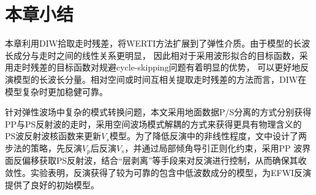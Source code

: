 \section{本章小结}
本章利用DIW拾取走时残差，将WERTI方法扩展到了弹性介质。由于模型的长波长成分与走时之间的线性关系更明显，
因此相对于采用波形拟合的目标函数，采用走时残差的目标函数对规避cycle-skipping问题有着明显的优势，
可以更好地反演模型的长波长分量。相对空间或时间互相关提取走时残差的方法而言，DIW在模型复杂时更加稳健可靠。

针对弹性波场中复杂的模式转换问题，本文采用地面数据P/S分离的方式分别获得PP与PS反射波的走时，采用空间波场模式解耦的方式来获得更具有物理含义的
PS波反射波核函数来更新$V_s$模型。为了降低反演中的非线性程度，文中设计了两步法的策略，先反演$V_p$后反演$V_s$，并通过局部倾角导引正则化约束，采用PP
波界面反偏移获取PS反射波，结合“层剥离”等手段来对反演进行控制，从而确保其收敛性。实验表明，反演获得了较为可靠的包含中低波数成分的模型，为EFWI反演提供了良好的初始模型。
